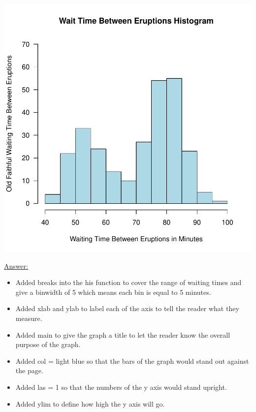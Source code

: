 \documentclass[12pt,letterpaper,final]{article}
\begin{document}
\begin{enumerate}
\begin{enumerate}
\begin{Schunk}
\end{Schunk}
\includegraphics{rnw_example-009}

\underline{Answer:}
\begin{itemize}
\item Added breaks into the his function to cover the range of waiting times and give a binwidth of 5 which means
each bin is equal to 5 minutes.
\item Added xlab and ylab to label each of the axis to tell the reader what they measure.
\item Added main to give the graph a title to let the reader know the overall purpose of the graph.
\item Added col = light blue so that the bars of the graph would stand out against the page.
\item Added las = 1 so that the numbers of the y axis would stand upright.
\item Added ylim to define how high the y axis will go.
\end{itemize}






\end{enumerate}
\end{enumerate}
\end{document}
